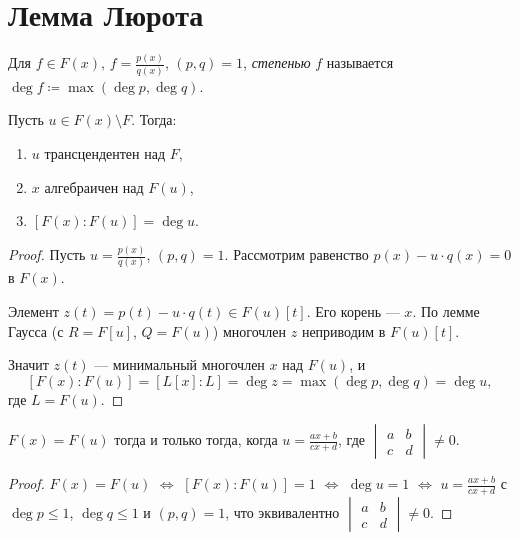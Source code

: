 \section{Лемма Люрота}

\begin{definition}
	Для $f \in F(x)$, $f = \frac{p(x)}{q(x)}$, $(p, q) = 1$, \emph{степенью} $f$ называется $\deg f \coloneqq \max(\deg p,\deg q)$.
\end{definition}

\begin{lemma}[Люрота]
	Пусть $u \in F(x) \setminus F$. Тогда:
	\begin{enumerate}
		\item $u$ трансцендентен над $F$,
		\item $x$ алгебраичен над $F(u)$,
		\item $[F(x) : F(u)] = \deg u$.
	\end{enumerate}

	\begin{proof}
		Пусть $u = \frac{p(x)}{q(x)}$, $(p, q) = 1$. Рассмотрим равенство $p(x) - u \cdot q(x) = 0$ в $F(x)$.

		Элемент $z(t) = p(t) - u \cdot q(t) \in F(u)[t]$. Его корень --- $x$.
        По лемме Гаусса (с $R = F[u]$, $Q = F(u)$) многочлен $z$ неприводим в $F(u)[t]$.

		Значит $z(t)$ --- минимальный многочлен $x$ над $F(u)$, и
		\[
			[F(x) : F(u)] = [L[x] : L] = \deg z = \max(\deg p, \deg q) = \deg u,
		\]
		где $L = F(u)$.
	\end{proof}
\end{lemma}


\begin{cor}
	$F(x) = F(u)$ тогда и только тогда, когда $u = \frac{ax + b}{cx + d}$, где $\begin{vmatrix} a & b \\ c & d \end{vmatrix}\neq 0$.

	\begin{proof}
		$F(x) = F(u)$ $\Leftrightarrow$ $[F(x) : F(u)] = 1$ $\Leftrightarrow$ $\deg u = 1$
        $\Leftrightarrow$ $u = \frac{ax + b}{cx + d}$ с $\deg p \leq 1$, $\deg q \leq 1$ и $(p, q) = 1$,
        что эквивалентно $\begin{vmatrix} a & b \\ c & d \end{vmatrix} \neq 0$.
	\end{proof}
\end{cor}
